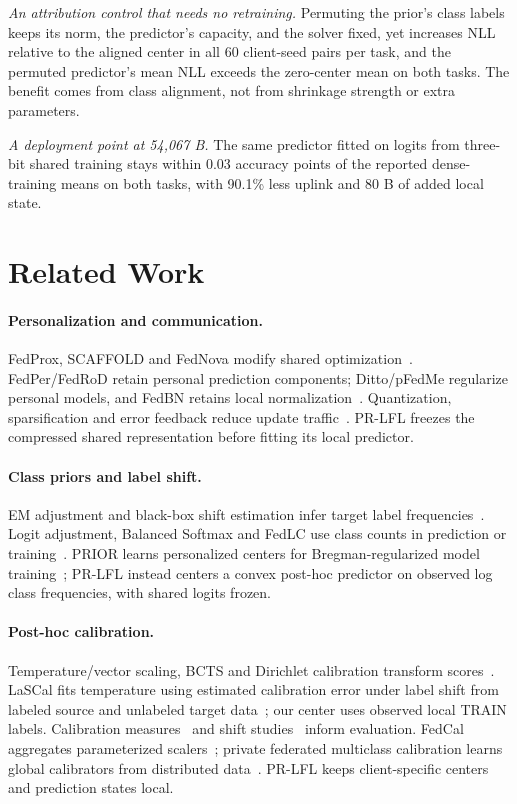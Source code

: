 \emph{An attribution control that needs no retraining.} Permuting the prior's class labels keeps its norm, the predictor's capacity, and the solver fixed, yet increases NLL relative to the aligned center in all 60 client-seed pairs per task, and the permuted predictor's mean NLL exceeds the zero-center mean on both tasks. The benefit comes from class alignment, not from shrinkage strength or extra parameters.

\emph{A deployment point at 54,067 B.} The same predictor fitted on logits from three-bit shared training stays within 0.03 accuracy points of the reported dense-training means on both tasks, with 90.1\% less uplink and 80 B of added local state.

\section{Related Work}
\paragraph{Personalization and communication.}
FedProx, SCAFFOLD and FedNova modify shared optimization~\cite{li2020fedprox,karimireddy2020scaffold,wang2020fednova}. FedPer/FedRoD retain personal prediction components; Ditto/pFedMe regularize personal models, and FedBN retains local normalization~\cite{li2021ditto,dinh2020pfedme,li2021fedbn}. Quantization, sparsification and error feedback reduce update traffic~\cite{alistarh2017qsgd,stich2018sparsified,karimireddy2019errorfeedback}. PR-LFL freezes the compressed shared representation before fitting its local predictor.

\paragraph{Class priors and label shift.}
EM adjustment and black-box shift estimation infer target label frequencies~\cite{saerens2002prior,lipton2018bbse}. Logit adjustment, Balanced Softmax and FedLC use class counts in prediction or training~\cite{menon2021logitadjust,ren2020balanced,zhang2022fedlc}. PRIOR learns personalized centers for Bregman-regularized model training~\cite{shi2023prior}; PR-LFL instead centers a convex post-hoc predictor on observed log class frequencies, with shared logits frozen.

\paragraph{Post-hoc calibration.}
Temperature/vector scaling, BCTS and Dirichlet calibration transform scores~\cite{guo2017calibration,alexandari2020labelshift,kull2019dirichlet}. LaSCal fits temperature using estimated calibration error under label shift from labeled source and unlabeled target data~\cite{popordanoska2024lascal}; our center uses observed local TRAIN labels. Calibration measures~\cite{vaicenavicius2019calibration,kumar2019verified} and shift studies~\cite{ovadia2019shift} inform evaluation. FedCal aggregates parameterized scalers~\cite{peng2024fedcal}; private federated multiclass calibration learns global calibrators from distributed data~\cite{maddock2025privatecal}. PR-LFL keeps client-specific centers and prediction states local.
